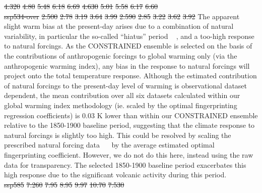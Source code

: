 \documentclass[gmd, manuscript]{copernicus}
\providecommand{\DIFadd}[1]{{\protect\color{blue}#1}} %
\providecommand{\DIFdel}[1]{{\protect\color{red}\sout{#1}}}                      %
\providecommand{\DIFaddbegin}{} %
\providecommand{\DIFaddend}{} %
\providecommand{\DIFdelbegin}{} %
\providecommand{\DIFdelend}{} %
\begin{document}
\DIFdel{4.320 }%
\DIFdel{4.80 }%
\DIFdel{5.48 }%
\DIFdel{6.18 }%
\DIFdel{6.69 }%
\DIFdel{4.630 }%
\DIFdel{5.01 }%
\DIFdel{5.58 }%
\DIFdel{6.17 }%
\DIFdel{6.60 }\DIFdelend \\
\DIFdelbegin \DIFdel{ssp534-over               }%
\DIFdel{2.500 }%
\DIFdel{2.78 }%
\DIFdel{3.19 }%
\DIFdel{3.64 }%
\DIFdel{3.99 }%
\DIFdel{2.590 }%
\DIFdel{2.85 }%
\DIFdel{3.22 }%
\DIFdel{3.62 }%
\DIFdel{3.92 }\DIFdelend %
\DIFaddbegin \DIFadd{The apparent slight warm bias at the present-day arises due to a combination of natural variability, in particular the so-called “hiatus” period \mbox{%
\citep{Trenberth2013}}\hspace{0pt}%
, and a too-high response to natural forcings. As the CONSTRAINED ensemble is selected on the basis of the contributions of anthropogenic forcings to global warming only (via the anthropogenic warming index), any bias in the response to natural forcings will project onto the total temperature response. Although the estimated contribution of natural forcings to the present-day level of warming is observational dataset dependent, the mean contribution over all six datasets calculated within our global warming index methodology (ie. scaled by the optimal fingerprinting regression coefficients) is 0.03 K lower than within our CONSTRAINED ensemble relative to the 1850-1900 baseline period, suggesting that the climate response to natural forcings is slightly too high. This could be resolved by scaling the prescribed natural forcing data \mbox{%
\citep{Smith2020c} }\hspace{0pt}%
by the average estimated optimal fingerprinting coefficient. However, we do not do this here, instead using the raw data for transparency. The selected 1850-1900 baseline period exacerbates this high response due to the significant volcanic activity during this period. }\DIFaddend \\\DIFdelbegin \DIFdel{ssp585                    }%
\DIFdel{7.260 }%
\DIFdel{7.95 }%
\DIFdel{8.95 }%
\DIFdel{9.97 }%
\DIFdel{10.70 }%
\DIFdel{7.530 }%
\end{document}
